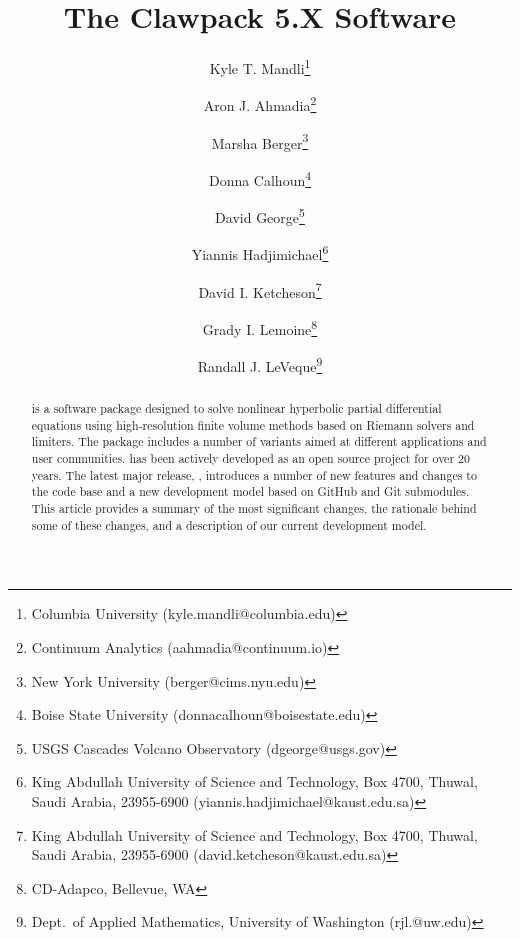 \documentclass[]{article}
\begin{document}
\ifpdf
{}
\else
{}
\fi

\title{The Clawpack 5.X Software}


\author{
        Kyle T. Mandli\thanks{
            Columbia University (\mbox{kyle.mandli@columbia.edu})} \and
        Aron J. Ahmadia\thanks{
            Continuum Analytics (\mbox{aahmadia@continuum.io})} \and
        Marsha Berger\thanks{
            New York University (\mbox{berger@cims.nyu.edu})} \and
        Donna Calhoun\thanks{
            Boise State University (\mbox{donnacalhoun@boisestate.edu})} \and
        David George\thanks{
            USGS Cascades Volcano Observatory (\mbox{dgeorge@usgs.gov})} \and
        Yiannis Hadjimichael\thanks{
            King Abdullah University of Science and Technology, Box 4700, Thuwal, Saudi Arabia, 23955-6900 (\mbox{yiannis.hadjimichael@kaust.edu.sa})} \and
        David I. Ketcheson\thanks{
            King Abdullah University of Science and Technology, Box 4700, Thuwal, Saudi Arabia, 23955-6900 (\mbox{david.ketcheson@kaust.edu.sa})} \and
        Grady I. Lemoine\thanks{
            CD-Adapco, Bellevue, WA} \and
        Randall J. LeVeque\thanks{
            Dept.\ of Applied Mathematics, University of Washington (\mbox{rjl.@uw.edu})}
        }

\maketitle
\linenumbers
\begin{abstract}
    \clawpack is a software package designed to solve nonlinear
hyperbolic partial differential equations using high-resolution finite volume
methods based on Riemann solvers and limiters. The package includes a number
of variants aimed at different applications and user communities.
\clawpack has been actively developed as an open source project
for over 20 years.  The latest major release, , introduces
a number of new features and changes to the code base and a new
development model based on GitHub and Git submodules.  
This article provides a summary of the most significant changes,
the rationale behind some of these changes, and a description of our current
development model.
\end{abstract}









% 



\end{document}
